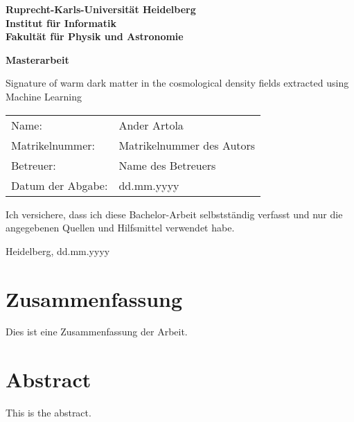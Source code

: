 \documentclass[
     12pt,                    %
     a4paper,             %
     BCOR=10mm,     %
     DIV=14,                 %
     listof=totoc,                    %
     bibliography=totoc,       %
     index=totoc,              %
     twoside,
     headsepline
     ]{scrreprt}
\begin{document}
\begin{titlepage}


\vspace*{1cm}
\begin{center}
\vspace*{3cm}
\textbf{ 
\Large Ruprecht-Karls-Universität Heidelberg\\
\smallskip
\Large Institut für Informatik\\
\smallskip
\Large Fakult\"{a}t f\"{u}r Physik und Astronomie\\
\smallskip
}

\vspace{3cm}

\textbf{\large Masterarbeit} %

\vspace{0.5\baselineskip}
{\huge
Signature of warm dark matter in the
cosmological density fields extracted using
Machine Learning
}
\end{center}

\vfill 

{\large
\begin{tabular}[l]{ll}
Name: & Ander Artola\\
Matrikelnummer: & Matrikelnummer des Autors\\
Betreuer: & Name des Betreuers\\
Datum der Abgabe: & dd.mm.yyyy
\end{tabular}
}

\end{titlepage}

\onehalfspacing

\thispagestyle{empty}

\vspace*{100pt}
\noindent
Ich versichere, dass ich diese Bachelor-Arbeit selbstständig verfasst und nur die angegebenen
Quellen und Hilfsmittel verwendet habe.

\vspace*{50pt}

\noindent
Heidelberg, dd.mm.yyyy
\cleardoublepage

\section*{Zusammenfassung}

Dies ist eine Zusammenfassung der Arbeit.

\section*{Abstract}

This is the abstract.

\cleardoublepage

\tableofcontents
\cleardoublepage
{} 


\cleardoublepage












\printbibliography
\end{document}
